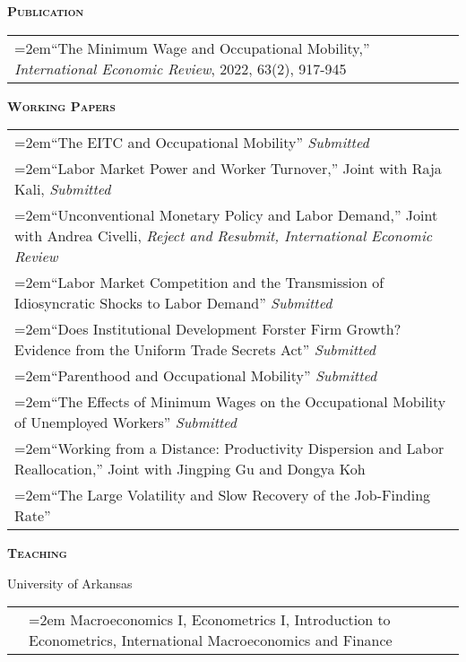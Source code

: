 \documentclass[11pt]{article}
\newenvironment{rSection}[1]{ %
  {\large\bf\textsc{#1}}
  \vspace{0.15cm}
  \begin{list}{}{ %
    \setlength{\leftmargin}{1.5em} %
    \setlength{\rightmargin}{1.5em}
  }
  \item[]
}{
  \end{list}
  \vspace{0.15cm}
}
\begin{document}
\begin{rSection}{Publication}
\begin{tabularx}{\linewidth}{>{\hangindent=2em}X}
``The Minimum Wage and Occupational Mobility,'' \emph{International Economic Review}, 2022, 63(2), 917-945\\
\end{tabularx}
\end{rSection}

\begin{rSection}{Working Papers}
\begin{tabularx}{\linewidth}{>{\hangindent=2em}X}
``The EITC and Occupational Mobility'' \emph{Submitted}\\
``Labor Market Power and Worker Turnover,'' Joint with Raja Kali, \emph{Submitted}\\
``Unconventional Monetary Policy and Labor Demand,'' Joint with Andrea Civelli, \emph{Reject and Resubmit, International Economic Review}\\
``Labor Market Competition and the Transmission of Idiosyncratic Shocks to Labor Demand'' \emph{Submitted}\\
``Does Institutional Development Forster Firm Growth? Evidence from the Uniform Trade Secrets Act'' \emph{Submitted}\\
``Parenthood and Occupational Mobility'' \emph{Submitted}\\
``The Effects of Minimum Wages on the Occupational Mobility of Unemployed Workers'' \emph{Submitted}\\
``Working from a Distance: Productivity Dispersion and Labor Reallocation,'' Joint with Jingping Gu and Dongya Koh\\
``The Large Volatility and Slow Recovery of the Job-Finding Rate''\\

\end{tabularx}
\end{rSection}


\begin{rSection}{Teaching}
University of Arkansas\\
\begin{tabularx}{\linewidth}{p{0.3cm} >{\hangindent=2em}X}
& Macroeconomics I, Econometrics I, Introduction to Econometrics, International Macroeconomics and Finance\\[0.3cm]
\end{tabularx}
\end{rSection}
\end{document}
